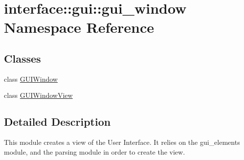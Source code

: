 \hypertarget{namespaceinterface_1_1gui_1_1gui__window}{\section{interface\-:\-:gui\-:\-:gui\-\_\-window \-Namespace \-Reference}
\label{namespaceinterface_1_1gui_1_1gui__window}
}
\subsection*{\-Classes}
\begin{DoxyCompactItemize}
\item 
class \hyperlink{classinterface_1_1gui_1_1gui__window_1_1_g_u_i_window}{\-G\-U\-I\-Window}
\item 
class \hyperlink{classinterface_1_1gui_1_1gui__window_1_1_g_u_i_window_view}{\-G\-U\-I\-Window\-View}
\end{DoxyCompactItemize}


\subsection{\-Detailed \-Description}
\begin{DoxyVerb}This module creates a view of the User Interface.
It relies on the gui_elements module, and the parsing module in order to create
the view.\end{DoxyVerb}
 